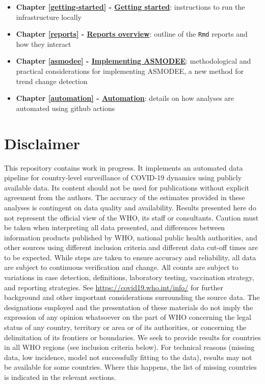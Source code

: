 \documentclass[]{book}
\begin{document}
\begin{itemize}
\item
  \textbf{Chapter \ref{getting-started} - \protect\hyperlink{getting-started}{Getting started}}:
  instructions to run the infrastructure locally
\item
  \textbf{Chapter \ref{reports} - \protect\hyperlink{reports}{Reports overview}}: outline of the
  \texttt{Rmd} reports and how they interact
\item
  \textbf{Chapter \ref{asmodee} - \protect\hyperlink{asmodee}{Implementing ASMODEE}}: methodological
  and practical considerations for implementing ASMODEE, a new method for trend
  change detection
\item
  \textbf{Chapter \ref{automation} - \protect\hyperlink{automation}{Automation}}: details on how
  analyses are automated using github actions
\end{itemize}

\hypertarget{disclaimer}{%
\section{Disclaimer}\label{disclaimer}}

This repository contains work in progress. It implements an automated data pipeline for country-level surveillance of COVID-19 dynamics using publicly available data. Its content should not be used for publications without explicit agreement from the authors. The accuracy of the estimates provided in these analyses is contingent on data quality and availability. Results presented here do not represent the official view of the WHO, its staff or consultants. Caution must be taken when interpreting all data presented, and differences between information products published by WHO, national public health authorities, and other sources using different inclusion criteria and different data cut-off times are to be expected. While steps are taken to ensure accuracy and reliability, all data are subject to continuous verification and change. All counts are subject to variations in case detection, definitions, laboratory testing, vaccination strategy, and reporting strategies. See \url{https://covid19.who.int/info/} for further background and other important considerations surrounding the source data. The designations employed and the presentation of these materials do not imply the expression of any opinion whatsoever on the part of WHO concerning the legal status of any country, territory or area or of its authorities, or concerning the delimitation of its frontiers or boundaries. We seek to provide results for countries in all WHO regions (see inclusion criteria below). For technical reasons (missing data, low incidence, model not successfully fitting to the data), results may not be available for some countries. Where this happens, the list of missing countries is indicated in the relevant sections.
\end{document}

